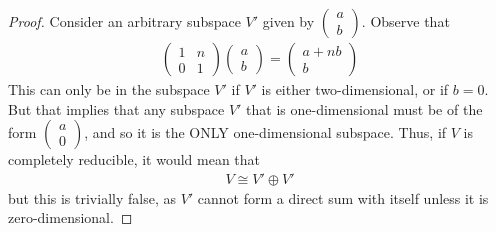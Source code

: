 \documentclass[num=4,duedate=03-03-21,course=Algebra\ II,proflastname=Walton]{hwtemplate}
\begin{document}
\begin{proof}
Consider an arbitrary subspace \(V'\) given by \(\begin{pmatrix} a\\b \end{pmatrix} \). Observe that
\begin{align*}
	\begin{pmatrix} 1 & n \\ 0 & 1 \end{pmatrix} \begin{pmatrix} a \\ b \end{pmatrix} = \begin{pmatrix} a+nb \\ b \end{pmatrix} 
\end{align*}
This can only be in the subspace \(V'\) if \(V'\) is either two-dimensional, or if \(b = 0\). But that implies that any subspace \(V'\) that is one-dimensional must be of the form \(\begin{pmatrix} a \\ 0 \end{pmatrix} \), and so it is the ONLY one-dimensional subspace. Thus, if \(V\) is completely reducible, it would mean that
\begin{align*}
	V \cong V' \oplus V'
\end{align*}
but this is trivially false, as \(V'\) cannot form a direct sum with itself unless it is zero-dimensional.
\end{proof}
\end{document}
